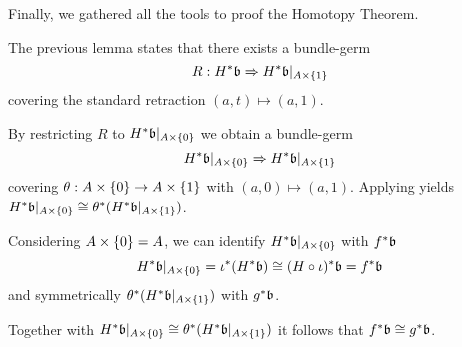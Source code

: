 \begin{myparagraph}
    Finally, we gathered all the tools to proof the Homotopy Theorem.
\end{myparagraph}

\begin{myproof}
    The previous lemma states that there exists a bundle-germ
    \[ \germdef{R}{\ind{H}\bb}{\ind{H}\bb[\cylup{A}]} \]
    covering the standard retraction $(a, t) \mapsto (a, 1)$.

    By restricting $R$ to $\ind{H}\bb[\cyldown{A}]$ we obtain a bundle-germ
    \[ \germ{\ind{H}\bb[\cyldown{A}]}{\ind{H}\bb[\cylup{A}]} \]
    covering $\theta: A \times{} \{0\} \to A \times{} \{1\}$ with $(a, 0) \mapsto (a, 1)$.
    Applying  yields $\ind{H}\bb[\cyldown{A}] \cong \ind{\theta}(\ind{H}\bb[\cylup{A}])$.

    Considering $A \times{} \{0\} = A$, we can identify $\ind{H}\bb[\cyldown{A}]$ with $\ind{f}\bb$
    \[ \ind{H}\bb[A \cross \{0\}] = \ind{\iota}(\ind{H}\bb) \cong \ind{(H \circ \iota)}\bb = \ind{f}\bb \]
    and symmetrically $\ind{\theta}(\ind{H}\bb[\cylup{A}])$ with $\ind{g}\bb$.

    Together with $\ind{H}\bb[\cyldown{A}] \cong \ind{\theta}(\ind{H}\bb[\cylup{A}])$
    it follows that $\ind{f}\bb \cong \ind{g}\bb$.
\end{myproof}